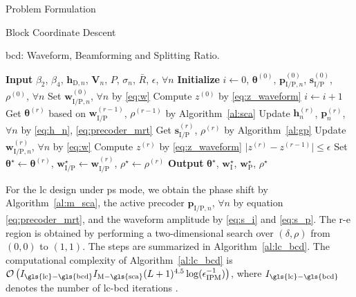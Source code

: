 \begin{section}{Problem Formulation}
\begin{subsection}{Block Coordinate Descent}
		\begin{algorithm}[!t]
			\caption{\gls{bcd}: Waveform, Beamforming and Splitting Ratio.}
			\label{al:bcd}
			\begin{algorithmic}[1]
				\State \textbf{Input} $\beta_2$, $\beta_4$, $\mathbf{h}_{\mathrm{D},n}$, $\mathbf{V}_{n}$, $P$, $\sigma_n$, $\bar{R}$, $\epsilon$, $\forall n$
				\State \textbf{Initialize} $i \gets 0$, $\boldsymbol{\theta}^{(0)}$, $\mathbf{p}_{\mathrm{I/P},n}^{(0)}$, $\mathbf{s}_{\mathrm{I/P}}^{(0)}$, $\rho^{(0)}$, $\forall n$
				\State Set $\mathbf{w}_{\mathrm{I/P},n}^{(0)}$, $\forall n$ by \eqref{eq:w}
				\State Compute $z^{(0)}$ by \eqref{eq:z_waveform}
				\Repeat
					\State $i \gets i + 1$
					\State Get $\boldsymbol{\theta}^{(r)}$ based on $\mathbf{w}_{\mathrm{I/P}}^{(r-1)}$, $\rho^{(r-1)}$ by Algorithm~\ref{al:sca}
					\State Update $\mathbf{h}_n^{(r)}$, $\mathbf{p}_n^{(r)}$, $\forall n$ by \eqref{eq:h_n}, \eqref{eq:precoder_mrt}
					\State Get $\mathbf{s}_{\mathrm{I/P}}^{(r)}$, $\rho^{(r)}$ by Algorithm~\ref{al:gp}
					\State Update $\mathbf{w}_{\mathrm{I/P},n}^{(r)}$, $\forall n$ by \eqref{eq:w}
					\State Compute $z^{(r)}$ by \eqref{eq:z_waveform}
				\Until $\lvert z^{(r)} - z^{(r-1)} \rvert \le \epsilon$
				\State Set $\boldsymbol{\theta}^{\star} \gets \boldsymbol{\theta}^{(r)}$, $\mathbf{w}_{\mathrm{I/P}}^{\star} \gets \mathbf{w}_{\mathrm{I/P}}^{(r)}$, $\rho^{\star} \gets \rho^{(r)}$
				\State \textbf{Output} $\boldsymbol{\theta}^{\star}$, $\mathbf{w}_{\mathrm{I}}^{\star}$, $\mathbf{w}_{\mathrm{P}}^{\star}$, $\rho^{\star}$
			\end{algorithmic}
		\end{algorithm}

		For the \gls{lc} design under \gls{ps} mode, we obtain the phase shift by Algorithm~\ref{al:m_sca}, the active precoder $\mathbf{p}_{\mathrm{I/P},n}$, $\forall n$ by equation \eqref{eq:precoder_mrt}, and the waveform amplitude by \eqref{eq:s_i} and \eqref{eq:s_p}.
		The \gls{r-e} region is obtained by performing a two-dimensional search over $(\delta, \rho)$ from $(0, 0)$ to $(1, 1)$. The steps are summarized in Algorithm~\ref{al:lc_bcd}. The computational complexity of Algorithm~\ref{al:lc_bcd} is $\mathcal{O}\left(I_{\mathrm{\gls{lc}-\gls{bcd}}}I_{\mathrm{M-\gls{sca}}}(L+1)^{4.5} \log(\epsilon_{\mathrm{IPM}}^{-1})\right)$, where $I_{\mathrm{\gls{lc}-\gls{bcd}}}$ denotes the number of \gls{lc}-\gls{bcd} iterations \cite{Luo2010b}.


\end{subsection}
\end{section}
